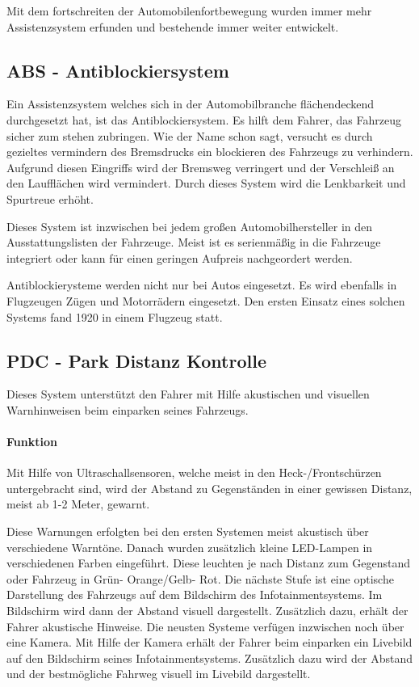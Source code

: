 Mit dem fortschreiten der Automobilenfortbewegung wurden immer mehr Assistenzsystem erfunden und bestehende immer weiter entwickelt. 
\subsection{ABS - Antiblockiersystem}
Ein Assistenzsystem welches sich in der Automobilbranche flächendeckend durchgesetzt hat, ist das Antiblockiersystem. Es hilft dem Fahrer, das Fahrzeug sicher zum stehen zubringen. Wie der Name schon sagt, versucht es durch gezieltes vermindern des Bremsdrucks ein blockieren des Fahrzeugs zu verhindern. Aufgrund diesen Eingriffs wird der Bremsweg verringert und der Verschleiß an den Laufflächen wird vermindert. Durch dieses System wird die Lenkbarkeit und Spurtreue erhöht.

Dieses System ist inzwischen bei jedem großen Automobilhersteller in den Ausstattungslisten der Fahrzeuge. Meist ist es serienmäßig in die Fahrzeuge integriert oder kann für einen geringen Aufpreis nachgeordert werden. 

Antiblockierysteme werden nicht nur bei Autos eingesetzt. Es wird ebenfalls in Flugzeugen Zügen und Motorrädern eingesetzt. 
Den ersten Einsatz eines solchen Systems fand 1920 in einem Flugzeug statt.

\subsection{PDC - Park Distanz Kontrolle}
Dieses System unterstützt den Fahrer mit Hilfe akustischen und visuellen Warnhinweisen beim einparken seines Fahrzeugs. 
\paragraph{Funktion}Mit Hilfe von Ultraschallsensoren, welche meist in den Heck-/Frontschürzen untergebracht sind, wird der Abstand zu Gegenständen in einer gewissen Distanz, meist ab 1-2 Meter, gewarnt. 

Diese Warnungen erfolgten bei den ersten Systemen meist akustisch über verschiedene Warntöne. Danach wurden zusätzlich kleine LED-Lampen in verschiedenen Farben eingeführt. Diese leuchten je nach Distanz zum Gegenstand oder Fahrzeug in Grün- Orange/Gelb- Rot. Die nächste Stufe ist eine optische Darstellung des Fahrzeugs auf dem Bildschirm des Infotainmentsystems. Im Bildschirm wird dann der Abstand visuell dargestellt. Zusätzlich dazu, erhält der Fahrer akustische Hinweise. Die neusten Systeme verfügen inzwischen noch über eine Kamera. Mit Hilfe der Kamera erhält der Fahrer beim einparken ein Livebild auf den Bildschirm seines Infotainmentsystems. Zusätzlich dazu wird der Abstand und der bestmögliche Fahrweg visuell im Livebild dargestellt.

